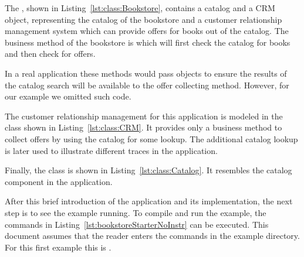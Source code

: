 \pagebreak

\noindent The , shown in Listing~\ref{lst:class:Bookstore}, contains a catalog and a CRM object, representing the catalog of the bookstore and a customer relationship management system which can provide offers for books out of the catalog. The business method of the bookstore is  which will first check the catalog for books and then check for offers.

In a real application these methods would pass objects to ensure the results of the catalog search will be available to the offer collecting method. However, for our example we omitted such code.



\noindent The customer relationship management for this application is modeled in the  class shown in Listing~\ref{lst:class:CRM}. It provides only a business method to collect offers by using the catalog for some lookup. The additional catalog lookup is later used to illustrate different traces in the application.




\enlargethispage{0.8cm}

\noindent Finally, the class  is shown in Listing~\ref{lst:class:Catalog}. It resembles the catalog component in the application.



\noindent After this brief introduction of the application and its implementation, the next step is to see the example running. To compile and run the example, the commands in Listing~\ref{lst:bookstoreStarterNoInstr} can be executed. This document assumes that the reader enters the commands in the example directory. For this first example this is .
\\

